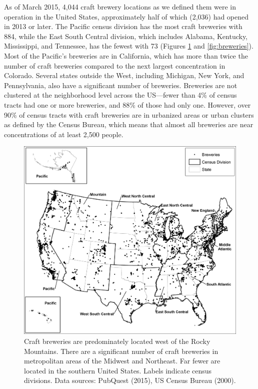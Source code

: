 \documentclass[]{article}
\begin{document}
As of March 2015, 4,044 craft brewery locations as we defined them were
in operation in the United States, approximately half of which (2,036)
had opened in 2013 or later. The Pacific census division has the most
craft breweries with 884, while the East South Central division, which
includes Alabama, Kentucky, Mississippi, and Tennessee, has the fewest
with 73 (Figures \ref{fig:usa} and \ref{fig:breweries}). Most of the Pacific's breweries are in
California, which has more than twice the number of craft breweries
compared to the next largest concentration in Colorado. Several states
outside the West, including Michigan, New York, and Pennsylvania, also
have a significant number of breweries. Breweries are not clustered at
the neighborhood level across the US---fewer than 4\% of census tracts
had one or more breweries, and 88\% of those had only one. However, over
90\% of census tracts with craft breweries are in urbanized areas or
urban clusters as defined by the Census Bureau, which means that almost
all breweries are near concentrations of at least 2,500 people.

\begin{figure}
	\centering
		\includegraphics[width=0.95\linewidth]{fig01.png}
	\caption{Craft breweries are predominately located west of the Rocky
Mountains. There are a significant number of craft breweries in
metropolitan areas of the Midwest and Northeast. Far fewer are located
in the southern United States. Labels indicate census divisions. Data
sources: PubQuest (2015), US Census Bureau (2000).}
	\label{fig:usa}
\end{figure} 
\end{document}
